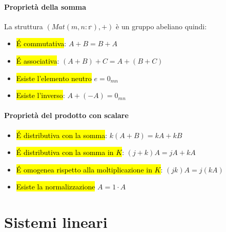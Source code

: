 \documentclass[a4paper,12pt,oneside]{article}
\begin{document}
\paragraph{Proprietà della somma} La struttura $(Mat(m,n:\mathbb{r}), +)$ è un
gruppo abeliano quindi:
\begin{itemize}
    \item \hl{\'E commutativa}: $A + B = B + A$
    \item \hl{\'E associativa}: $(A + B) + C = A + (B + C)$
    \item \hl{Esiste l'elemento neutro} $e = 0_{mn}$
    \item \hl{Esiste l'inverso}: $A + (-A) = 0_{mn}$
\end{itemize}

\paragraph{Proprietà del prodotto con scalare}
\begin{itemize}
    \item \hl{\'E distributiva con la somma}: $k (A + B) = kA + kB$
    \item \hl{\'E distributiva con la somma in $K$}: $(j + k)A = jA + kA$
    \item \hl{\'E omogenea rispetto alla moltiplicazione in $K$}:
        $(jk)A = j(kA)$
    \item \hl{Esiste la normalizzazione} $A = 1 \cdot A$
\end{itemize}

\section{Sistemi lineari}
\end{document}
